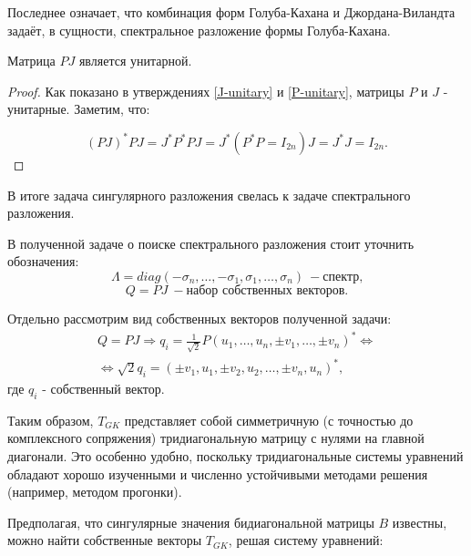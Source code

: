 Последнее означает, что комбинация форм Голуба-Кахана и Джордана-Виландта задаёт, в сущности, спектральное разложение формы Голуба-Кахана.


\begin{claim}
     Матрица \(PJ\) является унитарной.
\end{claim}
\begin{proof}
   Как показано в утверждениях  \ref{J-unitary} и \ref{P-unitary},  матрицы \(P\) и \(J\) - унитарные. Заметим, что:

    \[(PJ)^*PJ=J^* P^* P J=J^* (P^* P=I_{2n}) J=J^*J=I_{2n}.\]
    
\end{proof}


В итоге задача сингулярного разложения свелась к задаче спектрального разложения. 

\begin{note}
    В полученной задаче о поиске спектрального разложения стоит уточнить обозначения:
    \[
        \Lambda = diag(-\sigma_n,\dots,-\sigma_1,\sigma_1,\dots,\sigma_n) \ - \text{спектр,} 
    \]
    \[
        Q=PJ \ - \text{набор собственных векторов.}
    \]
\end{note}

Отдельно рассмотрим вид собственных векторов полученной задачи:
\begin{equation} \label{eq:eigenvector}
    \begin{split}
        Q=PJ \Rightarrow q_{i}=\frac{1}{\sqrt{2}}P(u_1,\dots,u_n,\pm v_1,\dots,\pm v_n)^* \Leftrightarrow \\[6pt]  \Leftrightarrow \sqrt{2}q_i=(\pm v_1,u_1,\pm v_2,u_2,\dots,\pm v_n,u_n)^*, 
    \end{split}
\end{equation}
где \(q_i\) - собственный вектор.


Таким образом, \( T_{GK} \) представляет собой симметричную (с точностью до комплексного сопряжения) тридиагональную матрицу с нулями на главной диагонали. Это особенно удобно, поскольку тридиагональные системы уравнений обладают хорошо изученными и численно устойчивыми методами решения (например, методом прогонки).



Предполагая, что сингулярные значения бидиагональной матрицы \( B \) известны, можно найти собственные векторы \( T_{GK} \), решая систему уравнений:

